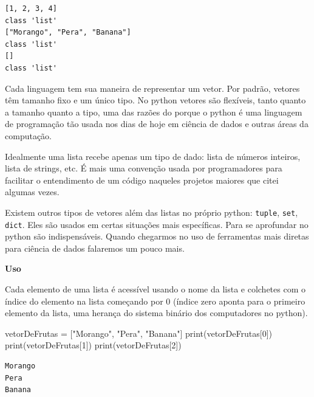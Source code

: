 \documentclass[
  letterpaper,
  DIV=11,
  numbers=noendperiod]{scrreprt}
\newenvironment{Shaded}{\begin{snugshade}}{\end{snugshade}}
\newcommand{\BuiltInTok}[1]{\textcolor[rgb]{0.00,0.23,0.31}{#1}}
\newcommand{\DecValTok}[1]{\textcolor[rgb]{0.68,0.00,0.00}{#1}}
\newcommand{\NormalTok}[1]{\textcolor[rgb]{0.00,0.23,0.31}{#1}}
\newcommand{\OperatorTok}[1]{\textcolor[rgb]{0.37,0.37,0.37}{#1}}
\newcommand{\StringTok}[1]{\textcolor[rgb]{0.13,0.47,0.30}{#1}}
\begin{document}
\begin{tcolorbox}[enhanced jigsaw, breakable, leftrule=.75mm, left=2mm, opacityback=0, bottomrule=.15mm, toprule=.15mm, rightrule=.15mm, arc=.35mm, colback=white]

\begin{verbatim}
[1, 2, 3, 4]
class 'list'
["Morango", "Pera", "Banana"]
class 'list'
[]
class 'list'
\end{verbatim}

\end{tcolorbox}

Cada linguagem tem sua maneira de representar um vetor. Por padrão,
vetores têm tamanho fixo e um único tipo. No python vetores são
flexíveis, tanto quanto a tamanho quanto a tipo, uma das razões do
porque o python é uma linguagem de programação tão usada nos dias de
hoje em ciência de dados e outras áreas da computação.

Idealmente uma lista recebe apenas um tipo de dado: lista de números
inteiros, lista de strings, etc. É mais uma convenção usada por
programadores para facilitar o entendimento de um código naqueles
projetos maiores que citei algumas vezes.

Existem outros tipos de vetores além das listas no próprio python:
\texttt{tuple}, \texttt{set}, \texttt{dict}. Eles são usados em certas
situações mais específicas. Para se aprofundar no python são
indispensáveis. Quando chegarmos no uso de ferramentas mais diretas para
ciência de dados falaremos um pouco mais.

\textbf{Uso}

Cada elemento de uma lista é acessível usando o nome da lista e
colchetes com o índice do elemento na lista começando por 0 (índice zero
aponta para o primeiro elemento da lista, uma herança do sistema binário
dos computadores no python).

\begin{Shaded}
\begin{Highlighting}[]
\NormalTok{vetorDeFrutas }\OperatorTok{=}\NormalTok{ [}\StringTok{"Morango"}\NormalTok{, }\StringTok{"Pera"}\NormalTok{, }\StringTok{"Banana"}\NormalTok{]}
\BuiltInTok{print}\NormalTok{(vetorDeFrutas[}\DecValTok{0}\NormalTok{])}
\BuiltInTok{print}\NormalTok{(vetorDeFrutas[}\DecValTok{1}\NormalTok{])}
\BuiltInTok{print}\NormalTok{(vetorDeFrutas[}\DecValTok{2}\NormalTok{])}
\end{Highlighting}
\end{Shaded}

\begin{tcolorbox}[enhanced jigsaw, breakable, leftrule=.75mm, left=2mm, opacityback=0, bottomrule=.15mm, toprule=.15mm, rightrule=.15mm, arc=.35mm, colback=white]

\begin{verbatim}
Morango
Pera
Banana
\end{verbatim}

\end{tcolorbox}
\end{document}
